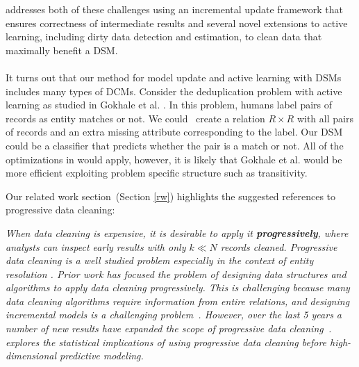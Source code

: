 {\sys addresses both of these challenges using an incremental update framework that ensures correctness of intermediate results and several novel extensions to active learning, including dirty data detection and estimation, to clean data that maximally benefit a DSM.\\
\\
It turns out that our method for model update and active learning with DSMs includes many types of DCMs.
Consider the deduplication problem with active learning as studied in Gokhale et al. \cite{gokhale2014corleone}.
In this problem, humans label pairs of records as entity matches or not.
We could~ create a relation $R \times R$ with all pairs of records and an extra missing attribute corresponding to the label. 
Our DSM could be a classifier that predicts whether the pair is a match or not.
All of the optimizations in \sys would apply, however, it is likely that Gokhale et al. would be more efficient exploiting problem specific structure such as transitivity.}

\vspace{0.5em}
Our related work section~(Section \ref{rw}) highlights the suggested references to progressive data cleaning:

\emph{When data cleaning is expensive, it is desirable to apply it \textbf{progressively}, where analysts can inspect early results with only $k \ll N$ records cleaned.
Progressive data cleaning is a well studied problem especially in the context of entity resolution \cite{altowim2014progressive, whang2014incremental, papenbrock2015progressive, gruenheid2014incremental}.
Prior work has focused  the problem of designing data structures and algorithms to apply data cleaning progressively.
This is challenging because many data cleaning algorithms require information from entire relations, and designing incremental models is a challenging problem~.
However, over the last 5 years a number of new results have expanded the scope of progressive data cleaning~\cite{mayfield2010eracer, DBLP:journals/pvldb/YakoutENOI11, yakout2013don}.
\sys explores the statistical implications of using progressive data cleaning before high-dimensional predictive modeling.}

\vspace{0.5em}

